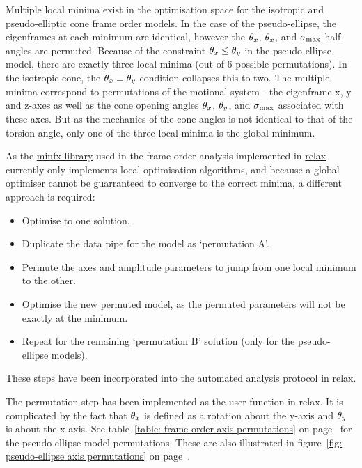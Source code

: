 Multiple local minima exist in the optimisation space for the isotropic and pseudo-elliptic cone frame order models.
In the case of the pseudo-ellipse, the eigenframes at each minimum are identical, however the $\theta_x$, $\theta_x$, and $\sigma_\textrm{max}$ half-angles are permuted.
Because of the constraint $\theta_x \le \theta_y$ in the pseudo-ellipse model, there are exactly three local minima (out of 6 possible permutations).
In the isotropic cone, the $\theta_x \equiv \theta_y$ condition collapses this to two.
The multiple minima correspond to permutations of the motional system - the eigenframe x, y and z-axes as well as the cone opening angles $\theta_x$, $\theta_y$, and $\sigma_\textrm{max}$ associated with these axes.
But as the mechanics of the cone angles is not identical to that of the torsion angle, only one of the three local minima is the global minimum.

As the \href{https://gna.org/projects/minfx/}{minfx library} used in the frame order analysis implemented in \href{http://www.nmr-relax.com}{relax} currently only implements local optimisation algorithms, and because a global optimiser cannot be guarranteed to converge to the correct minima, a different approach is required:
\begin{itemize}
    \item Optimise to one solution.
    \item Duplicate the data pipe for the model as `permutation A'.
    \item Permute the axes and amplitude parameters to jump from one local minimum to the other.
    \item Optimise the new permuted model,  as the permuted parameters will not be exactly at the minimum.
    \item Repeat for the remaining `permutation B' solution (only for the pseudo-ellipse models).
\end{itemize}

These steps have been incorporated into the automated analysis protocol in relax.

The permutation step has been implemented as the  user function in relax.
It is complicated by the fact that $\theta_x$ is defined as a rotation about the y-axis and $\theta_y$ is about the x-axis.
See table~\ref{table: frame order axis permutations} on page~\pageref{table: frame order axis permutations} for the pseudo-ellipse model permutations.
These are also illustrated in figure~\ref{fig: pseudo-ellipse axis permutations} on page~\pageref{fig: pseudo-ellipse axis permutations}.

